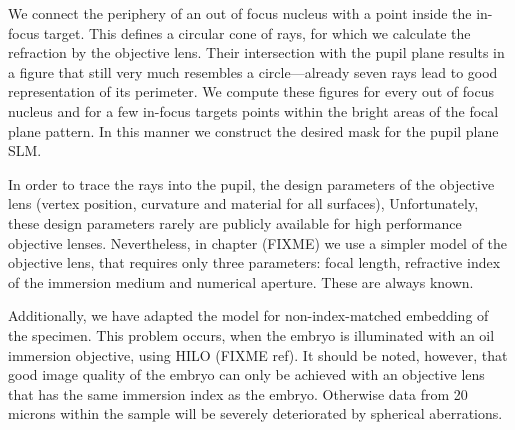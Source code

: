 We connect the periphery of an out of focus nucleus with a point
inside the in-focus target. This defines a circular cone of rays, for
which we calculate the refraction by the objective lens. Their
intersection with the pupil plane results in a figure that still very
much resembles a circle---already seven rays lead to good
representation of its perimeter.  We compute these figures for every
out of focus nucleus and for a few in-focus targets points within the
bright areas of the focal plane pattern. In this manner we construct
the desired mask for the pupil plane SLM.

In order to trace the rays into the pupil, the design parameters of
the objective lens (vertex position, curvature and material for all
surfaces), Unfortunately, these design parameters rarely are publicly
available for high performance objective lenses. Nevertheless, in
chapter (FIXME) we use a simpler model of the objective lens, that
requires only three parameters: focal length, refractive index of the
immersion medium and numerical aperture. These are always known.

Additionally, we have adapted the model for non-index-matched
embedding of the specimen. This problem occurs, when the embryo is
illuminated with an oil immersion objective, using HILO (FIXME
ref). It should be noted, however, that good image quality of the
embryo can only be achieved with an objective lens that has the same
immersion index as the embryo. Otherwise data from 20 microns within
the sample will be severely deteriorated by spherical aberrations.
